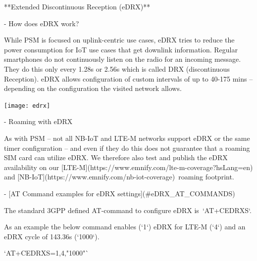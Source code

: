 \documentclass[11pt, oneside]{article}   	%
\newcommand{\addspace}{\vspace{2mm}}
\begin{document}
\pagebreak[4]

\begin{markdown}

**Extended Discontinuous Reception (eDRX)**

\end{markdown}
\addspace
\begin{markdown}
- How does eDRX work?  
\end{markdown}
\addspace
\begin{markdown}
While PSM is focused on uplink-centric use cases, eDRX tries to reduce the power consumption for IoT use cases that get downlink information.
Regular smartphones do not continuously listen on the radio for an incoming message.
They do this only every 1.28s or 2.56s which is called DRX (discontinuous Reception).
eDRX allows configuration of custom intervals of up to 40-175 mins -- depending on the configuration the visited network allows.
\end{markdown}
\addspace
\begin{center}
  \texttt{[image: edrx]}
\end{center}
\addspace
\begin{markdown}
- Roaming with eDRX  
\end{markdown}
\addspace
\begin{markdown}
As with PSM -- not all NB-IoT and LTE-M networks support eDRX or the same timer configuration -- and even if they do this does not guarantee that a roaming SIM card can utilize eDRX.
We therefore also test and publish the eDRX availability on our [LTE-M](https://www.emnify.com/lte-m-coverage?hsLang=en) and [NB-IoT](https://www.emnify.com/nb-iot-coverage) roaming footprint.
\end{markdown}
\addspace
\begin{markdown}
- [AT Command examples for eDRX settings](#eDRX_AT_COMMANDS)  
\end{markdown}
\addspace
\begin{markdown}

The standard 3GPP defined AT-command to configure eDRX is `AT+CEDRXS`.  

\end{markdown}
\addspace
\begin{markdown}

As an example the below command enables (`1`) eDRX for LTE-M (`4`) and an eDRX cycle of 143.36s (`1000`).

\end{markdown}
\addspace
\begin{markdown}

`AT+CEDRXS=1,4,"1000"`

\end{markdown}
\end{document}
